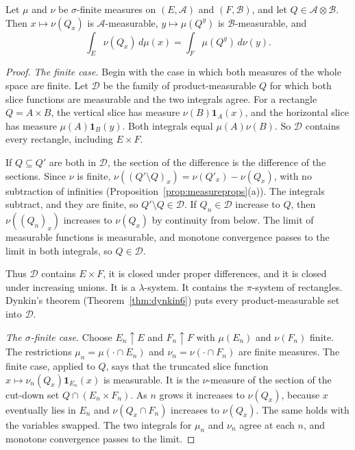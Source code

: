 \begin{lemma}\label{lem:slicemeasurable}
Let $\mu$ and $\nu$ be $\sigma$-finite measures on $(E,\mathcal A)$ and $(F,\mathcal B)$, and let $Q\in\mathcal A\otimes\mathcal B$. Then $x\mapsto\nu(Q_x)$ is $\mathcal A$-measurable, $y\mapsto\mu(Q^y)$ is $\mathcal B$-measurable, and
\[\int_E\nu(Q_x)\,d\mu(x)=\int_F\mu(Q^y)\,d\nu(y).\]
\end{lemma}
\begin{proof}
\emph{The finite case.} Begin with the case in which both measures of the whole space are finite. Let $\mathcal D$ be the family of product-measurable $Q$ for which both slice functions are measurable and the two integrals agree. For a rectangle $Q=A\times B$, the vertical slice has measure $\nu(B)\mathbf 1_A(x)$, and the horizontal slice has measure $\mu(A)\mathbf 1_B(y)$. Both integrals equal $\mu(A)\nu(B)$. So $\mathcal D$ contains every rectangle, including $E\times F$.

If $Q\subseteq Q'$ are both in $\mathcal D$, the section of the difference is the difference of the sections. Since $\nu$ is finite, $\nu((Q'\setminus Q)_x)=\nu(Q'_x)-\nu(Q_x)$, with no subtraction of infinities (Proposition~\ref{prop:measureprops}(a)). The integrals subtract, and they are finite, so $Q'\setminus Q\in\mathcal D$. If $Q_n\in\mathcal D$ increase to $Q$, then $\nu((Q_n)_x)$ increases to $\nu(Q_x)$ by continuity from below. The limit of measurable functions is measurable, and monotone convergence passes to the limit in both integrals, so $Q\in\mathcal D$.

Thus $\mathcal D$ contains $E\times F$, it is closed under proper differences, and it is closed under increasing unions. It is a $\lambda$-system. It contains the $\pi$-system of rectangles. Dynkin's theorem (Theorem~\ref{thm:dynkin6}) puts every product-measurable set into $\mathcal D$.

\emph{The $\sigma$-finite case.} Choose $E_n\uparrow E$ and $F_n\uparrow F$ with $\mu(E_n)$ and $\nu(F_n)$ finite. The restrictions $\mu_n=\mu(\cdot\cap E_n)$ and $\nu_n=\nu(\cdot\cap F_n)$ are finite measures. The finite case, applied to $Q$, says that the truncated slice function $x\mapsto\nu_n(Q_x)\mathbf 1_{E_n}(x)$ is measurable. It is the $\nu$-measure of the section of the cut-down set $Q\cap(E_n\times F_n)$. As $n$ grows it increases to $\nu(Q_x)$, because $x$ eventually lies in $E_n$ and $\nu(Q_x\cap F_n)$ increases to $\nu(Q_x)$. The same holds with the variables swapped. The two integrals for $\mu_n$ and $\nu_n$ agree at each $n$, and monotone convergence passes to the limit.
\end{proof}

